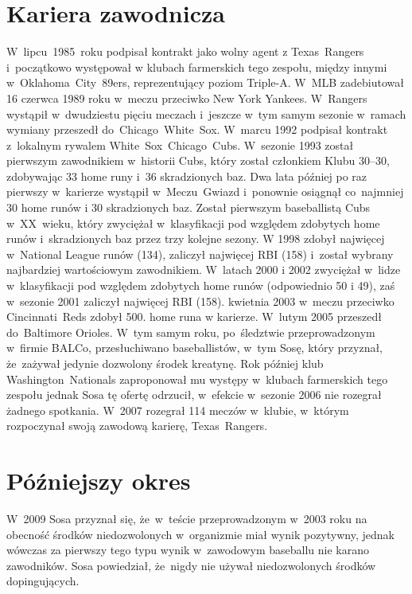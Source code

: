 \documentclass[a4paper,12pt]{article}
\begin{document}
\section{Kariera zawodnicza}
W~lipcu~1985~roku podpisał kontrakt jako wolny agent z Texas~Rangers i~początkowo występował w klubach farmerskich tego zespołu, między innymi w~Oklahoma~City~89ers, reprezentujący poziom Triple-A. W~MLB zadebiutował 16 czerwca 1989 roku w~meczu przeciwko New York Yankees. W~Rangers wystąpił w~dwudziestu pięciu meczach i~jeszcze w~tym samym sezonie w~ramach wymiany przeszedł do~Chicago~White~Sox.
\newline
\newline
W~marcu 1992 podpisał kontrakt z~lokalnym rywalem White~Sox~Chicago~Cubs. W~sezonie 1993 został pierwszym zawodnikiem w~historii Cubs, który został członkiem Klubu 30–30, zdobywając 33 home runy i~36 skradzionych baz. Dwa lata później po raz pierwszy w~karierze wystąpił w~Meczu~Gwiazd i~ponownie osiągnął co~najmniej 30 home runów i 30 skradzionych baz. Został pierwszym baseballistą Cubs w~XX~wieku, który zwyciężał w~klasyfikacji pod względem zdobytych home runów i~skradzionych baz przez trzy kolejne sezony. W 1998 zdobył najwięcej w~National League runów (134), zaliczył najwięcej RBI (158) i~został wybrany najbardziej wartościowym zawodnikiem. W~latach 2000 i 2002 zwyciężał w~lidze w~klasyfikacji pod względem zdobytych home runów (odpowiednio 50 i 49), zaś w~sezonie 2001 zaliczył najwięcej RBI (158).
\newline
{} kwietnia 2003 w~meczu przeciwko Cincinnati~Reds zdobył 500. home runa w karierze. W~lutym 2005 przeszedł do~Baltimore Orioles. W~tym samym roku, po~śledztwie przeprowadzonym w~firmie BALCo, przesłuchiwano baseballistów, w~tym Sosę, który przyznał, że~zażywał jedynie dozwolony środek kreatynę.
\newline
\newline
Rok później klub Washington~Nationals zaproponował mu występy w~klubach farmerskich tego zespołu jednak Sosa tę ofertę odrzucił, w~efekcie w~sezonie 2006 nie rozegrał żadnego spotkania. W~2007 rozegrał 114 meczów w~klubie, w~którym rozpoczynał swoją zawodową karierę, Texas~Rangers.

\section{Późniejszy okres}
W~2009 Sosa przyznał się, że~w~teście przeprowadzonym w~2003 roku na obecność środków niedozwolonych w~organizmie miał wynik pozytywny, jednak wówczas za pierwszy tego typu wynik w~zawodowym baseballu nie karano zawodników. Sosa powiedział, że~nigdy nie używał niedozwolonych środków dopingujących.
\end{document}
